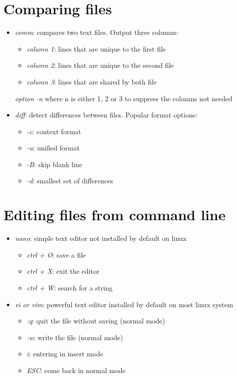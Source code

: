 \documentclass[a4paper,12pts]{article}
\begin{document}
\section{Comparing files}
\begin{itemize}
    \item \textit{comm}: compares two text files. Output three columns:
        \begin{itemize}
            \item \textit{column 1}: lines that are unique to the first file
            \item \textit{column 2}: lines that are unique to the second file
            \item \textit{column 3}: lines that are shared by both file
        \end{itemize}
        \textit {option -n} where n is either 1, 2 or 3 to suppress the columns
        not needed
    \item \textit{diff}: detect differences between files. Popular format
        options:
        \begin{itemize}
            \item \textit{-c}: context format
            \item \textit{-u}: unified format
            \item \textit{-B}: skip blank line
            \item \textit{-d}: smallest set of differences
        \end{itemize}

\end{itemize}
\section{Editing files from command line}
\begin{itemize}
    \item \textit{nano}: simple text editor not installed by default on linux
        \begin{itemize}
            \item \textit{ctrl + O}: save a file
            \item \textit{ctrl + X}: exit the editor
            \item \textit{ctrl + W}: search for a string
        \end{itemize}
    \item \textit{vi or vim}: powerful text editor installed by default on most
        linux system
        \begin{itemize}
            \item \textit{:q}: quit the file without saving (normal mode)
            \item \textit{:w}: write the file (normal mode)
            \item \textit{i}: entering in insert mode
            \item \textit{ESC}: come back in normal mode
        \end{itemize}
\end{itemize}
\end{document}
